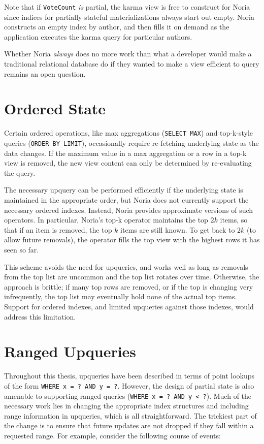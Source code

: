 Note that if \texttt{VoteCount} \emph{is} partial, the karma view is free to
construct for Noria since indices for partially stateful materializations always
start out empty. Noria constructs an empty index by author, and then fills it on
demand as the application executes the karma query for particular authors.

Whether Noria \emph{always} does no more work than what a developer would
make a traditional relational database do if they wanted to make a view
efficient to query remains an open question.

\section{Ordered State}
\label{s:fut:ordered}

Certain ordered operations, like max aggregations (\texttt{SELECT MAX}) and
top-k-style queries (\texttt{ORDER BY LIMIT}), occasionally require re-fetching
underlying state as the data changes. If the maximum value in a max aggregation
or a row in a top-k view is removed, the new view content can only be determined
by re-evaluating the query.

The necessary upquery can be performed efficiently if the underlying state is
maintained in the appropriate order, but Noria does not currently support the
necessary ordered indexes. Instead, Noria provides approximate versions of such
operators. In particular, Noria's top-k operator maintains the top $2k$ items,
so that if an item is removed, the top $k$ items are still known. To get back to
$2k$ (to allow future removals), the operator fills the top view with the
highest rows it has seen so far.

This scheme avoids the need for upqueries, and works well as long as removals
from the top list are uncommon and the top list rotates over time. Otherwise,
the approach is brittle; if many top rows are removed, or if the top is changing
very infrequently, the top list may eventually hold none of the actual top
items. Support for ordered indexes, and limited upqueries against those indexes,
would address this limitation.

\section{Ranged Upqueries}
\label{s:fut:ranged}

Throughout this thesis, upqueries have been described in terms of point lookups
of the form \texttt{WHERE x = ? AND y = ?}. However, the design of partial state
is also amenable to supporting ranged queries (\texttt{WHERE x = ? AND y < ?}).
Much of the necessary work lies in changing the appropriate index structures and
including range information in upqueries, which is all straightforward. The
trickiest part of the change is to ensure that future updates are not dropped if
they fall within a requested range. For example, consider the following course
of events:

